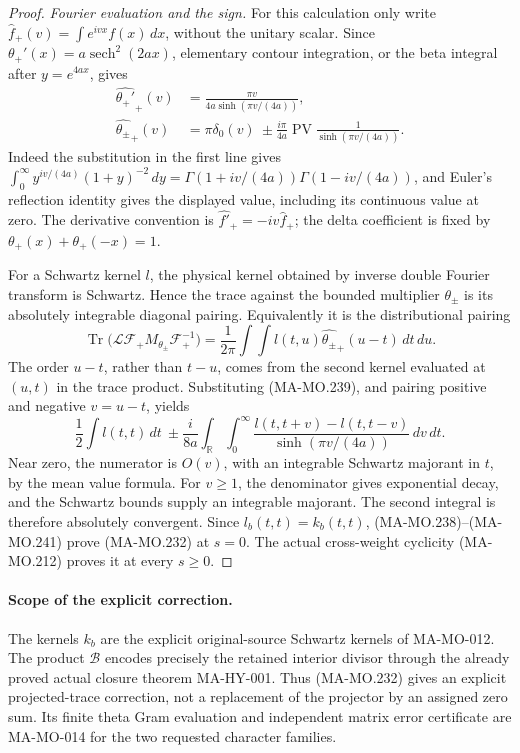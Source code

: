 \begin{proof}
\emph{Fourier evaluation and the sign.}
For this calculation only write
\(\widehat f_+(v)=\int e^{ivx}f(x)\,dx\), without
the unitary scalar.  Since
\(\theta_+'(x)=a\operatorname{sech}^2(2ax)\), elementary
contour integration, or the beta integral after
\(y=e^{4ax}\), gives
\[
 \begin{aligned}
 \widehat{\theta_+'}_+(v)
       &=\frac{\pi v}{4a\sinh(\pi v/(4a))},\\
 \widehat{\theta_\pm}_+(v)
       &=\pi\delta_0(v)
           \ \pm\frac{i\pi}{4a}\operatorname{PV}
                       \frac1{\sinh(\pi v/(4a))}.
 \end{aligned}
 \tag{MA-MO.239}
\]
Indeed the substitution in the first line gives
\(\int_0^\infty y^{iv/(4a)}(1+y)^{-2}\,dy
=\Gamma(1+iv/(4a))\Gamma(1-iv/(4a))\), and Euler's
reflection identity gives the displayed value, including its
continuous value at zero.  The derivative convention is
\(\widehat{f'}_+=-iv\widehat f_+\); the delta coefficient
is fixed by \(\theta_+(x)+\theta_+(-x)=1\).

For a Schwartz kernel \(l\), the physical kernel obtained
by inverse double Fourier transform is Schwartz.  Hence
the trace against the bounded multiplier \(\theta_\pm\)
is its absolutely integrable diagonal pairing.  Equivalently
it is the distributional pairing
\[
 \operatorname{Tr}\bigl(\mathcal L\mathcal F_+
                    M_{\theta_\pm}\mathcal F_+^{-1}\bigr)
     =\frac1{2\pi}\int\!\!\int
             l(t,u)\widehat{\theta_\pm}_+(u-t)\,dt\,du.
 \tag{MA-MO.240}
\]
The order \(u-t\), rather than \(t-u\), comes from the
second kernel evaluated at \((u,t)\) in the trace product.
Substituting (MA-MO.239), and pairing positive and negative
\(v=u-t\), yields
\[
 \frac12\int l(t,t)\,dt
       \ \pm\frac{i}{8a}\int_{\mathbb R}\int_0^\infty
          \frac{l(t,t+v)-l(t,t-v)}{\sinh(\pi v/(4a))}
                                                  \,dv\,dt.
 \tag{MA-MO.241}
\]
Near zero, the numerator is \(O(v)\), with an integrable
Schwartz majorant in \(t\), by the mean value formula.
For \(v\ge1\), the denominator gives exponential decay,
and the Schwartz bounds supply an integrable majorant.
The second integral is therefore absolutely convergent.
Since \(l_b(t,t)=k_b(t,t)\), (MA-MO.238)--(MA-MO.241)
prove (MA-MO.232) at \(s=0\).  The actual cross-weight
cyclicity (MA-MO.212) proves it at every \(s\ge0\).
\end{proof}

\paragraph{Scope of the explicit correction.}
The kernels \(k_b\) are the explicit original-source
Schwartz kernels of MA-MO-012.  The product \(\mathcal B\)
encodes precisely the retained interior divisor through the
already proved actual closure theorem MA-HY-001.  Thus
(MA-MO.232) gives an explicit projected-trace correction,
not a replacement of the projector by an assigned zero sum.
Its finite theta Gram evaluation and independent matrix
error certificate are MA-MO-014 for the two requested
character families.

